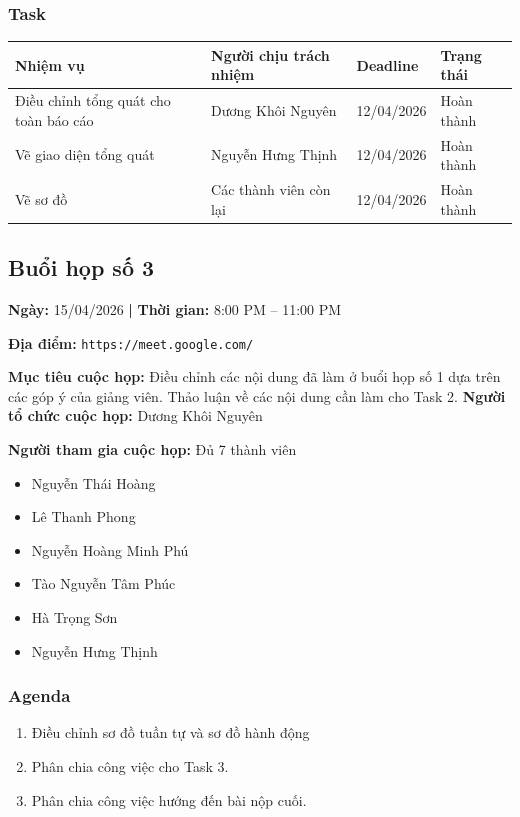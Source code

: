 \subsubsection*{Task}

\begin{longtable}{|p{5cm}|p{6cm}|p{2.5cm}|p{2.5cm}|}
\hline
\textbf{Nhiệm vụ} & \textbf{Người chịu trách nhiệm} & \textbf{Deadline} & \textbf{Trạng thái} \\
\hline
Điều chỉnh tổng quát cho toàn báo cáo & Dương Khôi Nguyên & 12/04/2026 & Hoàn thành \\
\hline
Vẽ giao diện tổng quát & Nguyễn Hưng Thịnh & 12/04/2026 & Hoàn thành \\
\hline
Vẽ sơ đồ & Các thành viên còn lại & 12/04/2026 & Hoàn thành \\
\hline
\end{longtable}

\subsection*{Buổi họp số 3}

\textbf{Ngày:} 15/04/2026 \textbf{|} \textbf{Thời gian:} 8:00 PM -- 11:00 PM 

\textbf{Địa điểm:} \texttt{https://meet.google.com/} 

\textbf{Mục tiêu cuộc họp:}
Điều chỉnh các nội dung đã làm ở buổi họp số 1 dựa trên các góp ý của giảng viên. Thảo luận về các nội dung cần làm cho Task 2.
\textbf{Người tổ chức cuộc họp:} Dương Khôi Nguyên

\textbf{Người tham gia cuộc họp:} Đủ 7 thành viên
\begin{itemize}
  \vspace{-10pt}
  \item Nguyễn Thái Hoàng
  \vspace{-10pt}
  \item Lê Thanh Phong
  \vspace{-10pt}
  \item Nguyễn Hoàng Minh Phú
  \vspace{-10pt}
  \item Tào Nguyễn Tâm Phúc
  \vspace{-10pt}
  \item Hà Trọng Sơn
  \vspace{-10pt}
  \item Nguyễn Hưng Thịnh
\end{itemize}

\subsubsection*{Agenda}
\begin{enumerate}
  \vspace{-10pt}
  \item Điều chỉnh sơ đồ tuần tự và sơ đồ hành động
  \vspace{-10pt}
  \item Phân chia công việc cho Task 3.
  \vspace{-10pt}
  \item Phân chia công việc hướng đến bài nộp cuối.
\end{enumerate}

